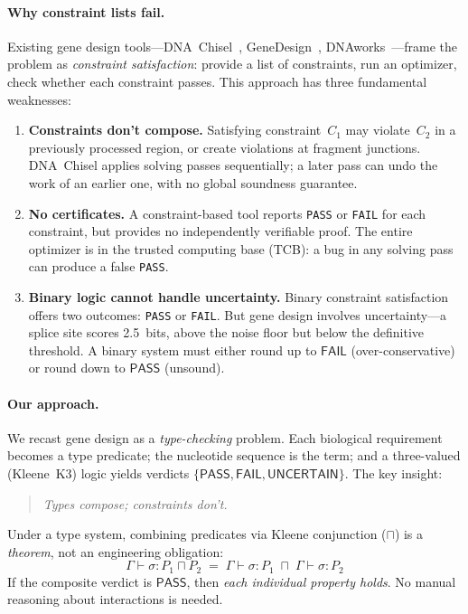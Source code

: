 \documentclass[runningheads]{llncs}
\newcommand{\PASS}{\ensuremath{\mathsf{PASS}}\xspace}
\newcommand{\FAIL}{\ensuremath{\mathsf{FAIL}}\xspace}
\newcommand{\UNCERTAIN}{\ensuremath{\mathsf{UNCERTAIN}}\xspace}
\newcommand{\seq}{\sigma}
\newcommand{\pred}{P}
\newcommand{\judg}[3]{#1 \vdash #2 : #3}
\begin{document}
\paragraph{Why constraint lists fail.}
Existing gene design tools---DNA~Chisel~\cite{piret2020dnachisel},
GeneDesign~\cite{richardson2006genedesign},
DNAworks~\cite{vandenbergh2015dnaworks}---frame the problem as
\emph{constraint satisfaction}: provide a list of constraints, run an
optimizer, check whether each constraint passes.
This approach has three fundamental weaknesses:

\begin{enumerate}[leftmargin=*,itemsep=1pt,topsep=2pt]
\item \textbf{Constraints don't compose.}
Satisfying constraint~$C_1$ may violate~$C_2$ in a previously
processed region, or create violations at fragment junctions.
DNA~Chisel applies solving passes sequentially; a later pass can undo
the work of an earlier one, with no global soundness guarantee.

\item \textbf{No certificates.}
A constraint-based tool reports \texttt{PASS} or \texttt{FAIL} for
each constraint, but provides no independently verifiable proof.
The entire optimizer is in the trusted computing base (TCB): a bug in
any solving pass can produce a false \texttt{PASS}.

\item \textbf{Binary logic cannot handle uncertainty.}
Binary constraint satisfaction offers two outcomes:
\texttt{PASS} or \texttt{FAIL}.
But gene design involves uncertainty---a splice site scores 2.5~bits,
above the noise floor but below the definitive threshold.
A binary system must either round up to \FAIL{} (over-conservative) or
round down to \PASS{} (unsound).
\end{enumerate}

\paragraph{Our approach.}
We recast gene design as a \emph{type-checking} problem.
Each biological requirement becomes a type predicate; the nucleotide
sequence is the term; and a three-valued (Kleene~K3) logic yields
verdicts $\{\PASS, \FAIL, \UNCERTAIN\}$.
The key insight:

\begin{quote}
\emph{Types compose; constraints don't.}
\end{quote}

\noindent Under a type system, combining predicates via Kleene
conjunction ($\sqcap$) is a \emph{theorem}, not an engineering
obligation:
\[
  \judg{\Gamma}{\seq}{\pred_1 \sqcap \pred_2}
  \;=\;
  \judg{\Gamma}{\seq}{\pred_1} \;\sqcap\;
  \judg{\Gamma}{\seq}{\pred_2}
\]
If the composite verdict is \PASS, then \emph{each individual property
holds}. No manual reasoning about interactions is needed.
\end{document}
